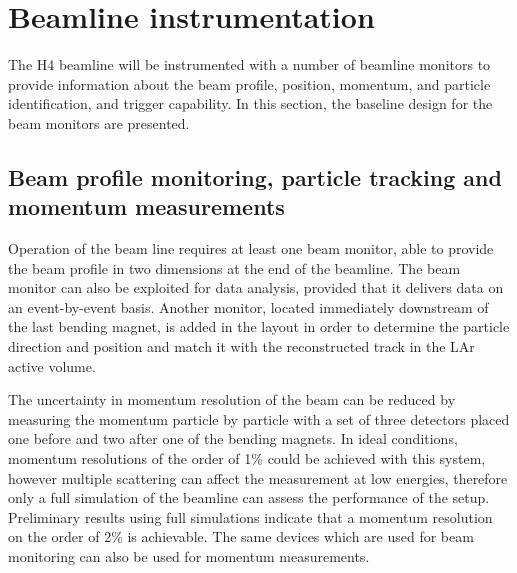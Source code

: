 \section{Beamline instrumentation}
\label{sec:beaminstruments}

The H4 beamline will be instrumented with a number of beamline monitors to provide information 
 about the beam profile, position, momentum, and particle identification, and trigger capability. 
 In this section, the baseline design for the beam monitors are presented. 

\subsection{Beam profile monitoring, particle tracking and momentum measurements}
Operation of the beam line requires at least one beam  monitor, able to provide the beam profile in two dimensions at the end of the beamline.   The beam monitor can also be exploited for data analysis, provided that it delivers data on an event-by-event basis. Another monitor, located immediately downstream of the last bending magnet, is added in the layout  in order to determine the particle  direction and position and match it with the reconstructed track in the LAr active volume.

The uncertainty in momentum resolution of the beam can be reduced by measuring the momentum particle by particle with a set of three detectors placed one before and two after one of the bending magnets. In ideal conditions, momentum resolutions of the order of 1\% could be achieved with this system, however  multiple scattering can affect the measurement
at low energies, therefore only a full simulation of the beamline can assess the performance of the setup.  
Preliminary results using full simulations indicate that a momentum resolution on the order of  2\% is achievable. The same devices which are used for beam monitoring can also be used for momentum measurements.
%
